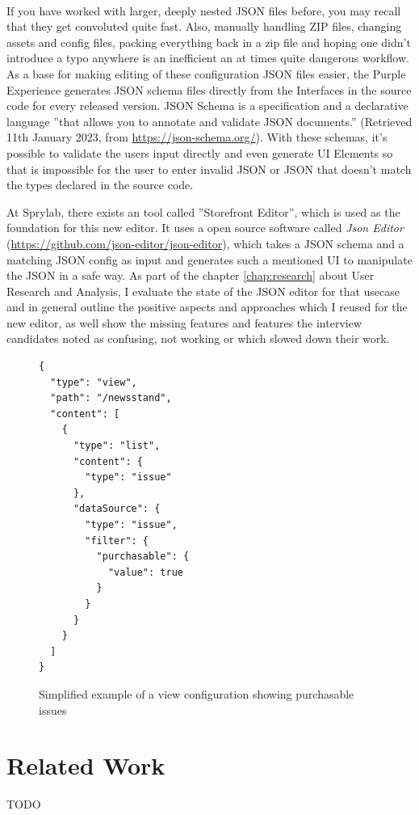 \\
If you have worked with larger, deeply nested JSON files before, you may recall that they get convoluted quite fast.
Also, manually handling ZIP files, changing assets and config files, packing everything back in a zip file and hoping one didn't introduce a typo anywhere is an inefficient an at times quite dangerous workflow.
\\
As a base for making editing of these configuration JSON files easier, the Purple Experience generates JSON schema files directly from the Interfaces in the source code for every released version.
JSON Schema is a specification and a declarative language ''that allows you to annotate and validate JSON documents.'' (Retrieved 11th January 2023, from \url{https://json-schema.org/}).
With these schemas, it's possible to validate the users input directly and even generate UI Elements so that is impossible for the user to enter invalid JSON or JSON that doesn't match the
types declared in the source code.

At Sprylab, there exists an tool called ''Storefront Editor'', which is used as the foundation for this new editor.
It uses a open source software called \textit{Json Editor} (\url{https://github.com/json-editor/json-editor}), which takes a JSON schema and a matching JSON config as input and generates such a mentioned UI to manipulate the JSON in a safe way.
As part of the chapter \ref{chap:research} about User Research and Analysis, I evaluate the state of the JSON editor for that usecase and in general outline the positive aspects and approaches which I reused for the new editor,
as well show the missing features and features the interview candidates noted as confusing, not working or which slowed down their work.

\begin{figure}
  \lstset{language=json,basicstyle=\footnotesize,numbers=left,showstringspaces=false,frame=single}
  \begin{lstlisting}
{
  "type": "view",
  "path": "/newsstand",
  "content": [
    {
      "type": "list",
      "content": {
        "type": "issue"
      },
      "dataSource": {
        "type": "issue",
        "filter": {
          "purchasable": {
            "value": true
          }
        }
      }
    }
  ]
}
  \end{lstlisting}
  \caption{Simplified example of a view configuration showing purchasable issues}
\end{figure}

\section{Related Work}

TODO